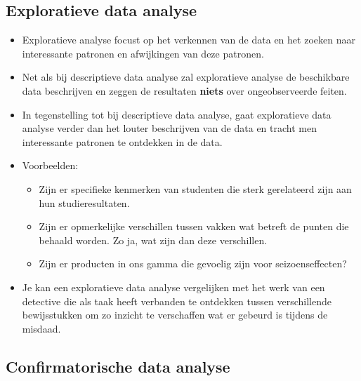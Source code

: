 \documentclass[]{memoir}
\providecommand{\tightlist}{%
  \setlength{\itemsep}{0pt}\setlength{\parskip}{0pt}}
\begin{document}
\subsection*{Exploratieve data analyse}\label{exploratieve-data-analyse}

\begin{itemize}
\tightlist
\item
  Exploratieve analyse focust op het verkennen van de data en het zoeken
  naar interessante patronen en afwijkingen van deze patronen.
\item
  Net als bij descriptieve data analyse zal exploratieve analyse de
  beschikbare data beschrijven en zeggen de resultaten \textbf{niets}
  over ongeobserveerde feiten.
\item
  In tegenstelling tot bij descriptieve data analyse, gaat exploratieve
  data analyse verder dan het louter beschrijven van de data en tracht
  men interessante patronen te ontdekken in de data.
\item
  Voorbeelden:

  \begin{itemize}
  \tightlist
  \item
    Zijn er specifieke kenmerken van studenten die sterk gerelateerd
    zijn aan hun studieresultaten.
  \item
    Zijn er opmerkelijke verschillen tussen vakken wat betreft de punten
    die behaald worden. Zo ja, wat zijn dan deze verschillen.
  \item
    Zijn er producten in ons gamma die gevoelig zijn voor
    seizoenseffecten?
  \end{itemize}
\item
  Je kan een exploratieve data analyse vergelijken met het werk van een
  detective die als taak heeft verbanden te ontdekken tussen
  verschillende bewijsstukken om zo inzicht te verschaffen wat er
  gebeurd is tijdens de misdaad.
\end{itemize}

\subsection*{Confirmatorische data
analyse}\label{confirmatorische-data-analyse}
\end{document}
